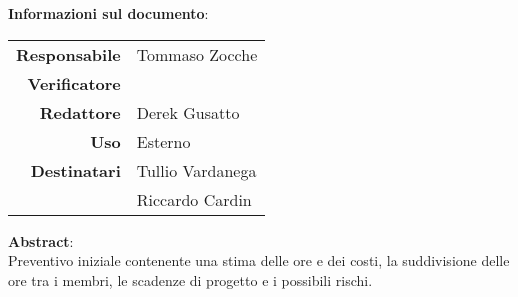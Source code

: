 \begin{center}
\textbf{Informazioni sul documento}: \\
\vspace{0.5cm}

\begin{tabular}{r|l}
    \textbf{Responsabile} &  Tommaso Zocche\\ 
    \textbf{Verificatore} &  \\ 
    \textbf{Redattore} &     Derek Gusatto\\ 
    \textbf{Uso} & Esterno \\ 
    \textbf{Destinatari} & Tullio Vardanega \\ & Riccardo Cardin \\ 
\end{tabular}

\vfill

\textbf{Abstract}: \\
\vspace{0.5cm}
Preventivo iniziale contenente una stima delle ore e dei costi, la suddivisione delle ore tra i membri, le scadenze di progetto e i possibili rischi.
\end{center}


\bigskip